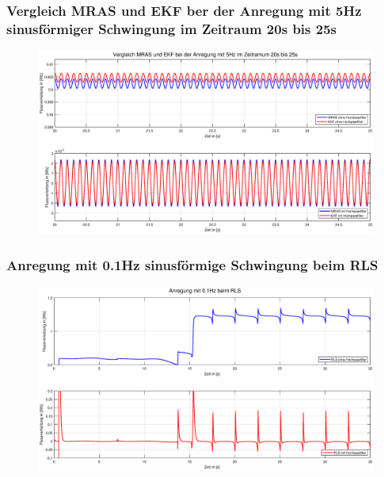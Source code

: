 \documentclass[serif,11pt, xcolor=table]{beamer}
\begin{document}
\begin{frame}
	\frametitle{Vergleich MRAS und EKF ber der Anregung mit 5Hz sinusförmiger Schwingung im Zeitraum 20s bis 25s }
	
	\begin{figure}[htbp]
		\centering
		\includegraphics[scale=0.30]{Abbildungen/Vergleich_5Hz_20s.eps}
		
	\end{figure}	
	
\end{frame}
\begin{frame}
		\frametitle{Anregung mit 0.1Hz sinusförmige Schwingung beim RLS}
		 
		\begin{figure}[htbp]
			\centering
			\includegraphics[scale=0.30]{Abbildungen/RLS_01.eps}
			
		\end{figure}	
		
	\end{frame}
\end{document}
